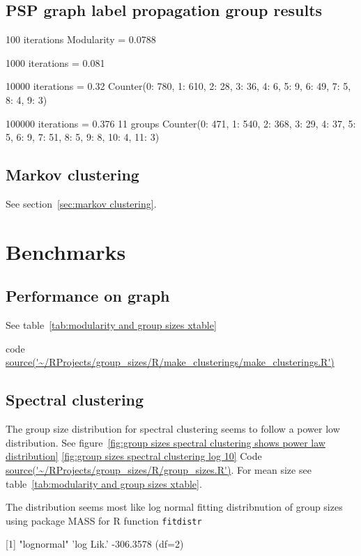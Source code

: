 \subsection{PSP graph label propagation group results}
100 iterations Modularity = 0.0788

1000 iterations = 0.081

10000 iterations = 0.32
Counter({0: 780, 1: 610, 2: 28, 3: 36, 4: 6, 5: 9, 6: 49, 7: 5, 8: 4, 9: 3})

100000 iterations = 0.376 11 groups
Counter({0: 471,
         1: 540,
         2: 368,
         3: 29,
         4: 37,
         5: 5,
         6: 9,
         7: 51,
         8: 5,
         9: 8,
         10: 4,
         11: 3})
 



\subsection{Markov clustering}
See section~\ref{sec:markov clustering}.


\section{Benchmarks}

\subsection{Performance on graph}
See table~\ref{tab:modularity and group sizes xtable} 

code \url{source('~/RProjects/group_sizes/R/make_clusterings/make_clusterings.R')}

\subsection{Spectral clustering}

The group size distribution for spectral clustering seems to follow a power low distribution. See figure~\ref{fig:group sizes spectral clustering shows power law distribution} \ref{fig:group sizes spectral clustering log 10} Code \url{source('~/RProjects/group_sizes/R/group_sizes.R')}. For mean size see table~\ref{tab:modularity and group sizes xtable}. 

The distribution seems most like log normal fitting distribnution of group sizes using package MASS for R function \texttt{fitdistr}

[1] "lognormal"
'log Lik.' -306.3578 (df=2)

